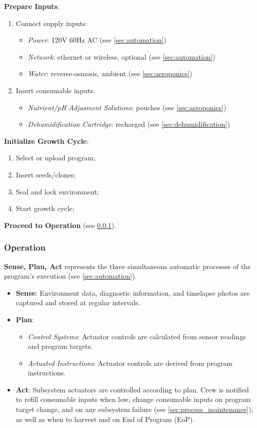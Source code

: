 \textbf{Prepare Inputs}:
\begin{enumerate}
    \item Connect supply inputs:
    \begin{itemize}
        \item \textit{Power}: 120V 60Hz AC (see \ref{sec:automation})
        \item \textit{Network}: ethernet or wireless, optional (see \ref{sec:automation})
        \item \textit{Water}: reverse-osmosis, ambient (see \ref{sec:aeroponics})
    \end{itemize}
    \item Insert consumable inputs:
    \begin{itemize}
        \item \textit{Nutrient/pH Adjusment Solutions}: pouches (see \ref{sec:aeroponics})
        \item \textit{Dehumidification Cartridge}: recharged (see \ref{sec:dehumidification})
    \end{itemize}
\end{enumerate}

\textbf{Initialize Growth Cycle}:
\begin{enumerate}
    \item Select or upload program;
    \item Insert seeds/clones;
    \item Seal and lock environment;
    \item Start growth cycle;
\end{enumerate}

\textbf{Proceed to Operation} (see \ref{sec:process_operation}).

\subsubsection{Operation}
\label{sec:process_operation}

\textbf{Sense, Plan, Act} represents the three simultaneous automatic processes of the program's execution (see \ref{sec:automation}).

\begin{itemize}
    \item \textbf{Sense}: Environment data, diagnostic information, and timelapse photos are captured and stored at regular intervals.
    \item \textbf{Plan}:
    \begin{itemize}
        \item \textit{Control Systems}: Actuator controls are calculated from sensor readings and program targets.
        \item \textit{Actuated Instructions}: Actuator controls are derived from program instructions.
    \end{itemize}
    \item \textbf{Act}: Subsystem actuators are controlled according to plan. Crew is notified to refill consumable inputs when low, change consumable inputs on program target change, and on any subsystem failure (see \ref{sec:process_maintenance}), as well as when to harvest and on End of Program (EoP).
\end{itemize}

